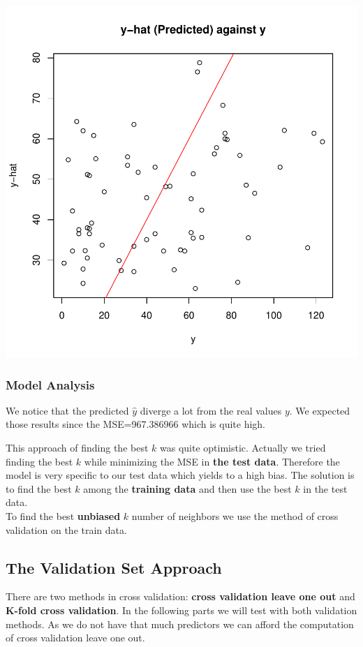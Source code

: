 \documentclass[]{report}
\begin{document}
\begin{center}
	\includegraphics[width=0.9\linewidth]{Figures/knn_predicted_test.pdf}
	\label{fig:knn_predicted_test}
\end{center}

\subsubsection{Model Analysis}

We notice that the predicted {$\hat{y}$} diverge a lot from the real values $y$. We expected those results since the MSE=967.386966 which is quite high. 

This approach of finding the best $k$ was quite optimistic. Actually we tried finding the best $k$ while minimizing the MSE in \textbf{the test data}. Therefore the model is very specific to our test data which yields to a high bias. The solution is to find the best $k$ among the \textbf{training data} and then use the best $k$ in the test data. \\ To find the best \textbf{unbiased} $k$ number of neighbors we use the method of cross validation on the train data. 

\subsection{The Validation Set Approach}
There are two methods in cross validation: \textbf{cross validation leave one out} and  \textbf{K-fold cross validation}. In the following parts we will test with both validation methods. As we do not have that much predictors we can afford the computation of cross validation leave one out.\\
\end{document}

